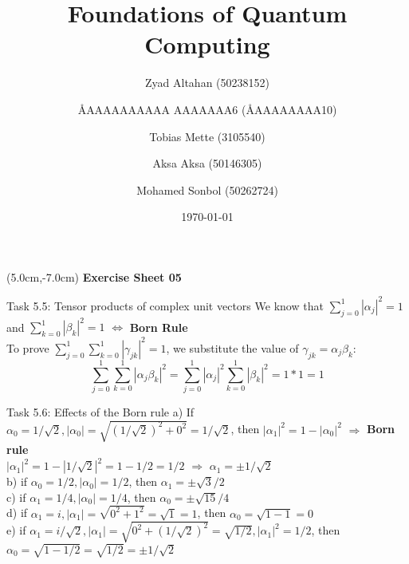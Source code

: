 \documentclass[aspectratio=169]{beamer}
\title{Foundations of Quantum Computing}
\author[]{Zyad Altahan (50238152) \and \AA{AAAAAAAAAA AAAAAAA}{6} (\AA{AAAAAAAA}{10}) \and Tobias Mette (3105540) \and Aksa Aksa (50146305) \and Mohamed Sonbol (50262724)}
\institute[]{Department of Computer Science \\ University of Bonn}
\date{\today}
\begin{document}
\begin{frame}
    \titlepage
    \begin{textblock*}{8cm}(5.0cm,-7.0cm)
        {\large \color{uwopurple}\hspace{0.66cm} \textbf{Exercise Sheet 05}} %
    \end{textblock*}
\end{frame}


\begin{frame}{Task 5.5: Tensor products of complex unit vectors}
  We know that $\sum_{j=0}^{1} |\alpha_j|^2 = 1$ and $\sum_{k=0}^{1} |\beta_k|^2 = 1$ $\Leftrightarrow$   \textbf{Born Rule}\\
  To prove $\sum_{j=0}^{1} \sum_{k=0}^{1} |\gamma_{jk}|^2 = 1$, we substitute the value of $\gamma_{jk} = \alpha_j \beta_k$:
  \[
    \sum_{j=0}^{1} \sum_{k=0}^{1} |\alpha_j \beta_k|^2  = \sum_{j=0}^{1} |\alpha_j|^2 \sum_{k=0}^{1} |\beta_k|^2 = 1 * 1 = 1
  \]
\end{frame}

\begin{frame}{Task 5.6: Effects of the Born rule}
  a) If $\alpha_0 = 1/\sqrt{2}, |\alpha_0| = \sqrt{(1/\sqrt{2})^2 + 0^2} = 1/\sqrt{2}$, then $|\alpha_{1}|^2 = 1 - |\alpha_{0}|^2$ $\Rightarrow$ \textbf{Born rule} \\
  $|\alpha_{1}|^2 = 1 - |1/\sqrt{2}|^2  = 1 - 1/2 = 1/2$ $\Rightarrow$  $\alpha_{1} = \pm 1/\sqrt{2}$\\

  b) if $\alpha_0 = 1/2, |\alpha_0| = 1/2$, then $\alpha_{1} = \pm \sqrt{3}/2$\\
  c) if $\alpha_1 = 1/4, |\alpha_0| = 1/4$, then $\alpha_{0} = \pm \sqrt{15}/4$\\
  d) if $\alpha_1 = i, |\alpha_1| = \sqrt{0^2 + 1^2} = \sqrt{1} = 1$, then $\alpha_{0} = \sqrt{1 - 1} = 0$\\
  e) if $\alpha_1 = i/\sqrt{2}, |\alpha_1| = \sqrt{0^2 + (1/\sqrt{2})^2} = \sqrt{1/2}, |\alpha_1|^2 = 1/2$, then $\alpha_{0} = \sqrt{1 - 1/2} = \sqrt{1/2} = \pm 1/\sqrt{2}$\\

\end{frame}
\end{document}
